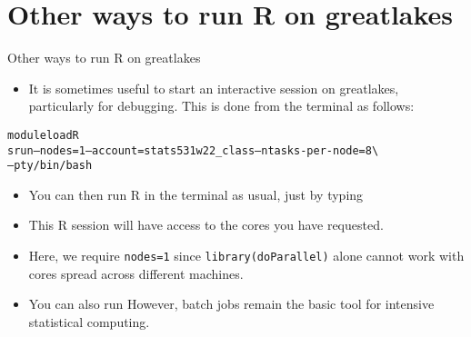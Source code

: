 \section{Other ways to run R on greatlakes}

\begin{frame}[fragile]{Other ways to run R on greatlakes}

\begin{itemize}
\item It is sometimes useful to start an interactive session on greatlakes, particularly for debugging. This is done from the terminal as follows:
\end{itemize}
\begin{knitrout}\small
{}\color{fgcolor}\begin{kframe}
\begin{alltt}
module load R
srun --nodes=1 --account=stats531w22_class --ntasks-per-node=8 \textbackslash{}
  --pty /bin/bash
\end{alltt}
\end{kframe}
\end{knitrout}
\begin{itemize}
\item You can then run R in the terminal as usual, just by typing
\begin{knitrout}\small
{}\color{fgcolor}\begin{kframe}
\begin{alltt}
\end{alltt}
\end{kframe}
\end{knitrout}
\item This R session will have access to the cores you have requested.
\item Here, we require \texttt{nodes=1} since \texttt{library(doParallel)} alone cannot work with cores spread across different machines.
\item You can also run 
However, batch jobs remain the basic tool for intensive statistical computing.
\end{itemize}

\end{frame}


